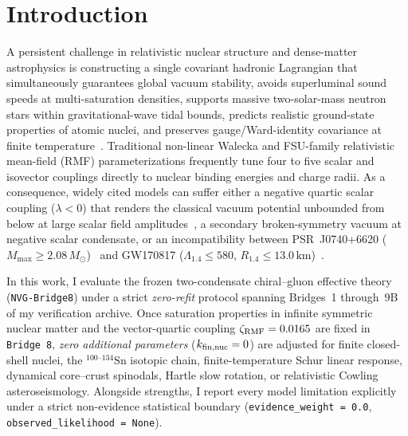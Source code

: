\documentclass[aps,prc,twocolumn,superscriptaddress,nofootinbib,floatfix]{revtex4-2}
\begin{document}
\begin{abstract}
boundedness/uniqueness and joint $M_{\max} \ge 2.08\,M_\odot$, $\Lambda_{1.4} \le 580$ constraints, while the larger finite-nucleus residuals relative to fitted RMF functionals transparently reflect its $k_{\rm fin,nuc} = 0$ out-of-sample discipline. Every check enforces a machine-verifiable non-evidence contract (\texttt{evidence\_weight = 0.0}, \texttt{observed\_likelihood = None}).
\end{abstract}

\maketitle

\section{Introduction}\label{sec:intro}

A persistent challenge in relativistic nuclear structure and dense-matter astrophysics is constructing a single covariant hadronic Lagrangian that simultaneously guarantees global vacuum stability, avoids superluminal sound speeds at multi-saturation densities, supports massive two-solar-mass neutron stars within gravitational-wave tidal bounds, predicts realistic ground-state properties of atomic nuclei, and preserves gauge/Ward-identity covariance at finite temperature~\cite{Serot1986,Boguta1977,ToddRutel2005,Fattoyev2010,Chen2014}. Traditional non-linear Walecka and FSU-family relativistic mean-field (RMF) parameterizations frequently tune four to five scalar and isovector couplings directly to nuclear binding energies and charge radii. As a consequence, widely cited models can suffer either a negative quartic scalar coupling ($\lambda < 0$) that renders the classical vacuum potential unbounded from below at large scalar field amplitudes~\cite{Lalazissis1997,Chen2014,Chen2015}, a secondary broken-symmetry vacuum at negative scalar condensate, or an incompatibility between PSR~J0740+6620 ($M_{\max} \ge 2.08\,M_\odot$)~\cite{Fonseca2021} and GW170817 ($\Lambda_{1.4} \le 580$, $R_{1.4} \le 13.0\,\mathrm{km}$)~\cite{Abbott2018}.

In this work, I evaluate the frozen two-condensate chiral--gluon effective theory (\texttt{NVG-Bridge8}) under a strict \emph{zero-refit} protocol spanning Bridges~1 through~9B of my verification archive. Once saturation properties in infinite symmetric nuclear matter and the vector-quartic coupling $\zeta_{\rm RMF} = 0.0165$ are fixed in \texttt{Bridge 8}, \emph{zero additional parameters} ($k_{\rm fin,nuc} = 0$) are adjusted for finite closed-shell nuclei, the $^{100\text{--}134}\mathrm{Sn}$ isotopic chain, finite-temperature Schur linear response, dynamical core--crust spinodals, Hartle slow rotation, or relativistic Cowling asteroseismology. Alongside strengths, I report every model limitation explicitly under a strict non-evidence statistical boundary (\texttt{evidence\_weight = 0.0}, \texttt{observed\_likelihood = None}).
\end{document}
